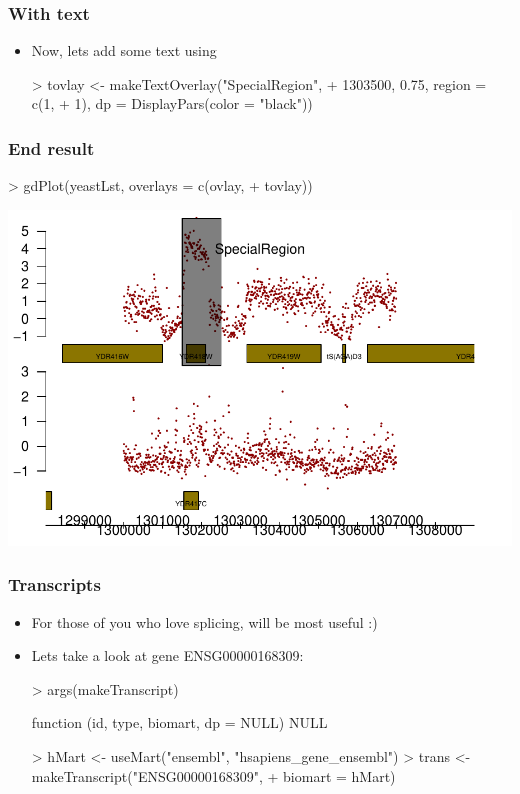 \begin{frame}
  \frametitle{With text}
  \begin{itemize}
  \item Now, lets add some text using 
\begin{Schunk}
\begin{Sinput}
> tovlay <- makeTextOverlay("SpecialRegion", 
+     1303500, 0.75, region = c(1, 
+         1), dp = DisplayPars(color = "black"))
\end{Sinput}
\end{Schunk}
  \end{itemize}
\end{frame}

\begin{frame}
  \frametitle{End result}
\begin{Schunk}
\begin{Sinput}
> gdPlot(yeastLst, overlays = c(ovlay, 
+     tovlay))
\end{Sinput}
\end{Schunk}
\includegraphics{plots/fig-039}
\end{frame}

\begin{frame}
  \frametitle{Transcripts}
  \begin{itemize}
  \item For those of you who love splicing,  will be most useful :)
  \item Lets take a look at gene ENSG00000168309: \scriptsize
\begin{Schunk}
\begin{Sinput}
> args(makeTranscript)
\end{Sinput}
\begin{Soutput}
function (id, type, biomart, dp = NULL) 
NULL
\end{Soutput}
\begin{Sinput}
> hMart <- useMart("ensembl", "hsapiens_gene_ensembl")
> trans <- makeTranscript("ENSG00000168309", 
+     biomart = hMart)
\end{Sinput}
\end{Schunk}
\normalsize
  \end{itemize}
\end{frame}

